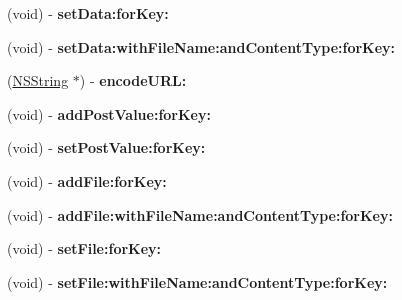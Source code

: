 \begin{DoxyCompactItemize}
\item 
\hypertarget{interface_a_s_i_form_data_request_a707a5cef615835146cdbed3ceca31016}{
(void) -\/ {\bfseries set\-Data\-:for\-Key\-:}}
\label{interface_a_s_i_form_data_request_a707a5cef615835146cdbed3ceca31016}

\item 
\hypertarget{interface_a_s_i_form_data_request_abbcca0f83bbe93f0132094a99a274098}{
(void) -\/ {\bfseries set\-Data\-:with\-File\-Name\-:and\-Content\-Type\-:for\-Key\-:}}
\label{interface_a_s_i_form_data_request_abbcca0f83bbe93f0132094a99a274098}

\item 
\hypertarget{interface_a_s_i_form_data_request_ab8c6677cbdb0cd4bf7660b79e5afa334}{
(\hyperlink{class_n_s_string}{\-N\-S\-String} $\ast$) -\/ {\bfseries encode\-U\-R\-L\-:}}
\label{interface_a_s_i_form_data_request_ab8c6677cbdb0cd4bf7660b79e5afa334}

\item 
\hypertarget{interface_a_s_i_form_data_request_af9571a143a9feeb009c33c458447aa98}{
(void) -\/ {\bfseries add\-Post\-Value\-:for\-Key\-:}}
\label{interface_a_s_i_form_data_request_af9571a143a9feeb009c33c458447aa98}

\item 
\hypertarget{interface_a_s_i_form_data_request_a90236e7099afbab72bb160029df5a368}{
(void) -\/ {\bfseries set\-Post\-Value\-:for\-Key\-:}}
\label{interface_a_s_i_form_data_request_a90236e7099afbab72bb160029df5a368}

\item 
\hypertarget{interface_a_s_i_form_data_request_afa340cd3b263a621a4f52015cdb8c568}{
(void) -\/ {\bfseries add\-File\-:for\-Key\-:}}
\label{interface_a_s_i_form_data_request_afa340cd3b263a621a4f52015cdb8c568}

\item 
\hypertarget{interface_a_s_i_form_data_request_ae413f676daaf869aa3cac76371466c16}{
(void) -\/ {\bfseries add\-File\-:with\-File\-Name\-:and\-Content\-Type\-:for\-Key\-:}}
\label{interface_a_s_i_form_data_request_ae413f676daaf869aa3cac76371466c16}

\item 
\hypertarget{interface_a_s_i_form_data_request_a8b097474a664290880231fd4439f352e}{
(void) -\/ {\bfseries set\-File\-:for\-Key\-:}}
\label{interface_a_s_i_form_data_request_a8b097474a664290880231fd4439f352e}

\item 
\hypertarget{interface_a_s_i_form_data_request_a1b319de7b302e41e0f2b62b04efd4976}{
(void) -\/ {\bfseries set\-File\-:with\-File\-Name\-:and\-Content\-Type\-:for\-Key\-:}}
\label{interface_a_s_i_form_data_request_a1b319de7b302e41e0f2b62b04efd4976}


\end{DoxyCompactItemize}
